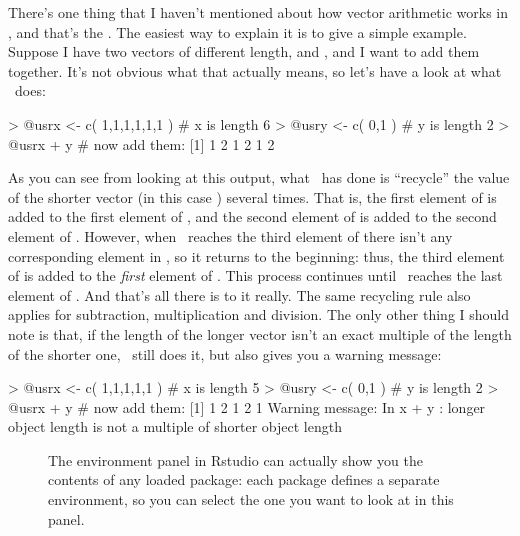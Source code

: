There's one thing that I haven't mentioned about how vector arithmetic works in \R, and that's the . The easiest way to explain it is to give a simple example. Suppose I have two vectors of different length,  and , and I want to add them together. It's not obvious what that actually means, so let's have a look at what \R\ does:
\begin{rblock1}
> @usr{x <- c( 1,1,1,1,1,1 )}  # x is length 6
> @usr{y <- c( 0,1 )}          # y is length 2
> @usr{x + y}                  # now add them:
[1] 1 2 1 2 1 2
\end{rblock1}
As you can see from looking at this output, what \R\ has done is ``recycle'' the value of the shorter vector (in this case ) several times. That is, the first element of  is added to the first element of , and the second element of  is added to the second element of . However, when \R\ reaches the third element of  there isn't any corresponding element in , so it returns to the beginning: thus, the third element of  is added to the {\it first} element of . This process continues until \R\ reaches the last element of . And that's all there is to it really. The same recycling rule also applies for subtraction, multiplication and division. The only other thing I should note is that, if the length of the longer vector isn't an exact multiple of the length of the shorter one, \R\ still does it, but also gives you a warning message:
\begin{rblock1}
> @usr{x <- c( 1,1,1,1,1 )}    # x is length 5
> @usr{y <- c( 0,1 )}          # y is length 2
> @usr{x + y}                  # now add them:
[1] 1 2 1 2 1
Warning message:
In x + y : longer object length is not a multiple of shorter object length
\end{rblock1}




\begin{figure}[t]
\begin{center}
\caption{The environment panel in Rstudio can actually show you the contents of any loaded package: each package defines a separate environment, so you can select the one you want to look at in this panel.}
\label{fig:envs}
\HR
\end{center}
\end{figure} 


